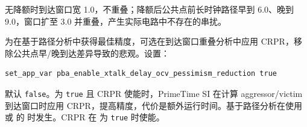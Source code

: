
无降额时到达窗口宽 1.0，不重叠；降额后公共点前长时钟路径早到 6.0、晚到 9.0，窗口扩至 3.0 并重叠，产生实际电路中不存在的串扰。

为在基于路径分析中获得最佳精度，可选在到达窗口重叠分析中应用 CRPR，移除公共点早/晚到达差异导致的悲观。设置：
\begin{lstlisting}
set_app_var pba_enable_xtalk_delay_ocv_pessimism_reduction true
\end{lstlisting}
默认 \texttt{false}。为 \texttt{true} 且 CRPR 使能时，PrimeTime SI 在计算 aggressor/victim 到达窗口时应用 CRPR，提高精度，代价是额外运行时间。基于路径分析在使用  或  的  时发生。CRPR 在  为 \texttt{true} 时使能。
